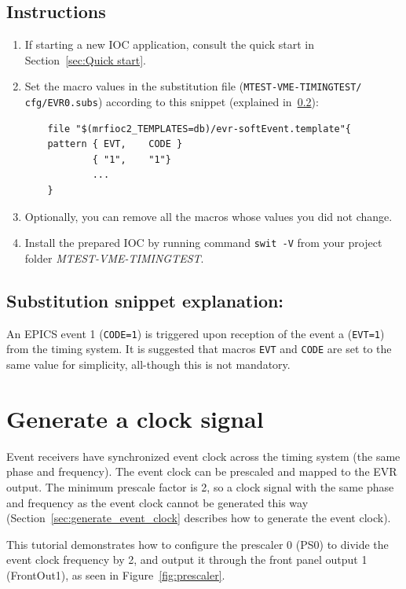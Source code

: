 \documentclass[12pt,a4paper]{article}
\begin{document}
\subsection{Instructions}
\begin{enumerate}
	\item If starting a new IOC application, consult the quick start in Section~\ref{sec:Quick start}.
	
	\item Set the macro values in the substitution file (\texttt{MTEST-VME-TIMINGTEST/} \texttt{cfg/EVR0.subs}) according to this snippet (explained in~\ref{sec:explain_event}):
\begin{verbatim}
	file "$(mrfioc2_TEMPLATES=db)/evr-softEvent.template"{
	pattern { EVT,    CODE }
	        { "1",    "1"}
	        ...
	}
\end{verbatim}
	\item Optionally, you can remove all the macros whose values you did not change. 

	\item Install the prepared IOC by running command \texttt{swit -V} from your project folder \textit{MTEST-VME-TIMINGTEST}.
\end{enumerate}

\subsection{Substitution snippet explanation:}\label{sec:explain_event}
An EPICS event 1 (\texttt{CODE=1}) is triggered upon reception of the event a (\texttt{EVT=1}) from the timing system.
It is suggested that macros \texttt{EVT} and \texttt{CODE} are set to the same value for simplicity, all-though this is not mandatory.

\section{Generate a clock signal}

Event receivers have synchronized event clock across the timing system (the same phase and frequency). The event clock can be prescaled and mapped to the EVR output. The minimum prescale factor is 2, so a clock signal with the same phase and frequency as the event clock cannot be generated this way (Section~\ref{sec:generate_event_clock} describes how to generate the event clock).

This tutorial demonstrates how to configure the prescaler 0 (PS0) to divide the event clock frequency by 2, and output it through the front panel output 1 (FrontOut1), as seen in Figure~\ref{fig:prescaler}. 
\end{document}
